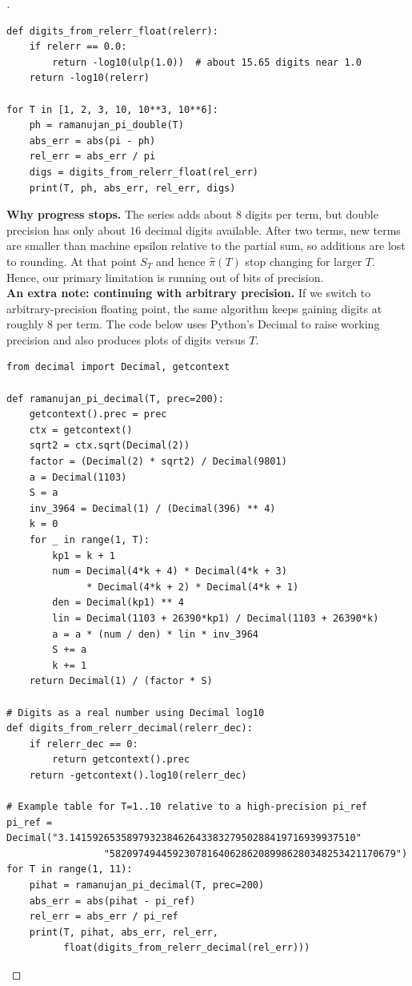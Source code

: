 \documentclass[11pt]{article}
\newenvironment{spacedproof}[1][\proofname]{%
  \begin{proof}[\textbf{#1}]$ $\par\nobreak\ignorespaces
}{%
  \end{proof}
}
\theoremstyle{definition}
\begin{document}
\begin{spacedproof}
\begin{lstlisting}
def digits_from_relerr_float(relerr):
    if relerr == 0.0:
        return -log10(ulp(1.0))  # about 15.65 digits near 1.0
    return -log10(relerr)

for T in [1, 2, 3, 10, 10**3, 10**6]:
    ph = ramanujan_pi_double(T)
    abs_err = abs(pi - ph)
    rel_err = abs_err / pi
    digs = digits_from_relerr_float(rel_err)
    print(T, ph, abs_err, rel_err, digs)
\end{lstlisting}

\textbf{Why progress stops.}
The series adds about $8$ digits per term, but double precision has only about $16$ decimal digits available. After two terms, new terms are smaller than machine epsilon relative to the partial sum, so additions are lost to rounding. At that point $S_T$ and hence $\widehat{\pi}(T)$ stop changing for larger $T$. Hence, our primary limitation is running out of bits of precision.\\

\textbf{An extra note: continuing with arbitrary precision.}
If we switch to arbitrary-precision floating point, the same algorithm keeps gaining digits at roughly $8$ per term. The code below uses Python’s Decimal to raise working precision and also produces plots of digits versus $T$.
\begin{lstlisting}
from decimal import Decimal, getcontext

def ramanujan_pi_decimal(T, prec=200):
    getcontext().prec = prec
    ctx = getcontext()
    sqrt2 = ctx.sqrt(Decimal(2))
    factor = (Decimal(2) * sqrt2) / Decimal(9801)
    a = Decimal(1103)
    S = a
    inv_3964 = Decimal(1) / (Decimal(396) ** 4)
    k = 0
    for _ in range(1, T):
        kp1 = k + 1
        num = Decimal(4*k + 4) * Decimal(4*k + 3)
              * Decimal(4*k + 2) * Decimal(4*k + 1)
        den = Decimal(kp1) ** 4
        lin = Decimal(1103 + 26390*kp1) / Decimal(1103 + 26390*k)
        a = a * (num / den) * lin * inv_3964
        S += a
        k += 1
    return Decimal(1) / (factor * S)

# Digits as a real number using Decimal log10
def digits_from_relerr_decimal(relerr_dec):
    if relerr_dec == 0:
        return getcontext().prec
    return -getcontext().log10(relerr_dec)

# Example table for T=1..10 relative to a high-precision pi_ref
pi_ref = Decimal("3.14159265358979323846264338327950288419716939937510"
                 "58209749445923078164062862089986280348253421170679")
for T in range(1, 11):
    pihat = ramanujan_pi_decimal(T, prec=200)
    abs_err = abs(pihat - pi_ref)
    rel_err = abs_err / pi_ref
    print(T, pihat, abs_err, rel_err,
          float(digits_from_relerr_decimal(rel_err)))
\end{lstlisting}    
\end{spacedproof}{Solution}
\end{document}
